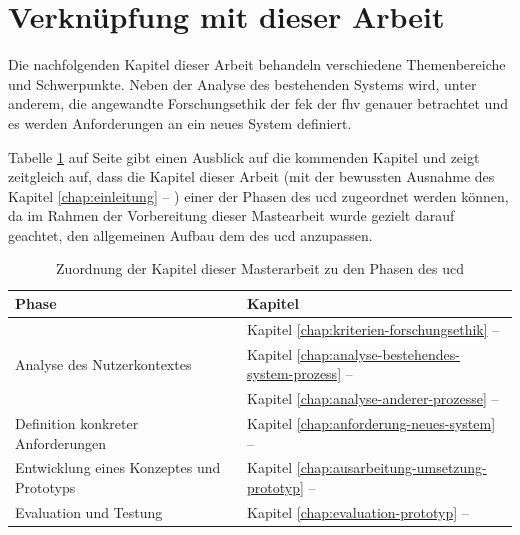 \documentclass[a4paper,12pt,twoside]{scrreprt}
\begin{document}
\section{Verknüpfung mit dieser Arbeit}
\label{sec:ucd-verknüpfung-arbeit}

Die nachfolgenden Kapitel dieser Arbeit behandeln verschiedene Themenbereiche und Schwerpunkte. Neben der Analyse des bestehenden Systems wird, unter anderem, die angewandte Forschungsethik der \acl{fek} der \acl{fhv} genauer betrachtet und es werden Anforderungen an ein neues System definiert.

Tabelle \ref{tab:zurordnung-kapitel-ucd} auf Seite \pageref{tab:zurordnung-kapitel-ucd} gibt einen Ausblick auf die kommenden Kapitel und zeigt zeitgleich auf, dass die Kapitel dieser Arbeit (mit der bewussten Ausnahme des Kapitel \ref{chap:einleitung} -- ) einer der Phasen des \acl{ucd} zugeordnet werden können, da im Rahmen der Vorbereitung dieser Mastearbeit wurde gezielt darauf geachtet, den allgemeinen Aufbau dem des \ac{ucd} anzupassen.

\begin{table}[ht]
    \centering
    \begin{tabular}{p{.35\linewidth} | p{.55\linewidth}}
        \textbf{Phase} & \textbf{Kapitel} \\ \hline
        \multirow{3}{\linewidth}{Analyse des Nutzerkontextes} & Kapitel \ref{chap:kriterien-forschungsethik} -- \nameref{chap:kriterien-forschungsethik} \\ \cline{2-2} 
         & Kapitel \ref{chap:analyse-bestehendes-system-prozess} -- \nameref{chap:analyse-bestehendes-system-prozess} \\ \cline{2-2} 
         & Kapitel \ref{chap:analyse-anderer-prozesse} -- \nameref{chap:analyse-anderer-prozesse} \\ \hline
        Definition konkreter Anforderungen & Kapitel \ref{chap:anforderung-neues-system} -- \nameref{chap:anforderung-neues-system} \\ \hline
        Entwicklung eines Konzeptes und Prototyps & Kapitel \ref{chap:ausarbeitung-umsetzung-prototyp} -- \nameref{chap:ausarbeitung-umsetzung-prototyp} \\ \hline
        Evaluation und Testung & Kapitel \ref{chap:evaluation-prototyp} -- \nameref{chap:evaluation-prototyp}
    \end{tabular}
    \caption{Zuordnung der Kapitel dieser Masterarbeit zu den Phasen des \acl{ucd}}
    \label{tab:zurordnung-kapitel-ucd}
\end{table}
\end{document}

